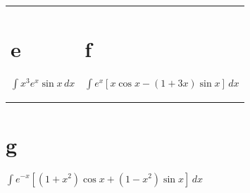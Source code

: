 \begin{exerciselist}
\begin{tabular}[t]{@{}p{168pt}@{}p{168pt}}
    \part{e} $\int x^{3}e^{x}\sin x\,dx$ & \part{f} $\int e^{x}\left[x\cos x-(1+3x)\sin x\right]\,dx$ \\[2\jot]
  \end{tabular}

\part{g} $\int e^{-x}\left[(1+x^{2})\cos x+(1-x^{2})\sin x\right]\,dx$
\end{exerciselist}
